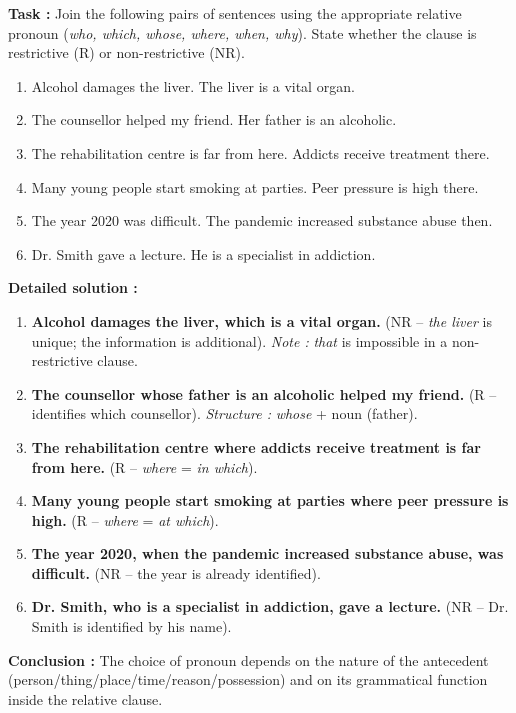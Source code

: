 \documentclass[11pt]{article}
\newcommand{\cle}[1]{{\popxbold\color{popdark}#1}}
\begin{document}
\begin{exoresolu}
\textbf{Task :} Join the following pairs of sentences using the appropriate relative pronoun (\textit{who, which, whose, where, when, why}). State whether the clause is restrictive (R) or non-restrictive (NR).
\begin{enumerate}
    \item Alcohol damages the liver. The liver is a vital organ.
    \item The counsellor helped my friend. Her father is an alcoholic.
    \item The rehabilitation centre is far from here. Addicts receive treatment there.
    \item Many young people start smoking at parties. Peer pressure is high there.
    \item The year 2020 was difficult. The pandemic increased substance abuse then.
    \item Dr. Smith gave a lecture. He is a specialist in addiction.
\end{enumerate}

\tcblower
\textbf{Detailed solution :}
\begin{enumerate}
    \item \textbf{Alcohol damages the liver, \cle{which} is a vital organ.} (NR -- \textit{the liver} is unique; the information is additional). \textit{Note :} \textit{that} is impossible in a non-restrictive clause.
    \item \textbf{The counsellor \cle{whose} father is an alcoholic helped my friend.} (R -- identifies which counsellor). \textit{Structure :} \textit{whose} + noun (father).
    \item \textbf{The rehabilitation centre \cle{where} addicts receive treatment is far from here.} (R -- \textit{where} = \textit{in which}).
    \item \textbf{Many young people start smoking at parties \cle{where} peer pressure is high.} (R -- \textit{where} = \textit{at which}).
    \item \textbf{The year 2020, \cle{when} the pandemic increased substance abuse, was difficult.} (NR -- the year is already identified).
    \item \textbf{Dr. Smith, \cle{who} is a specialist in addiction, gave a lecture.} (NR -- Dr. Smith is identified by his name).
\end{enumerate}
\textbf{Conclusion :} The choice of pronoun depends on the nature of the antecedent (person/thing/place/time/reason/possession) and on its grammatical function inside the relative clause.
\end{exoresolu}
\end{document}
